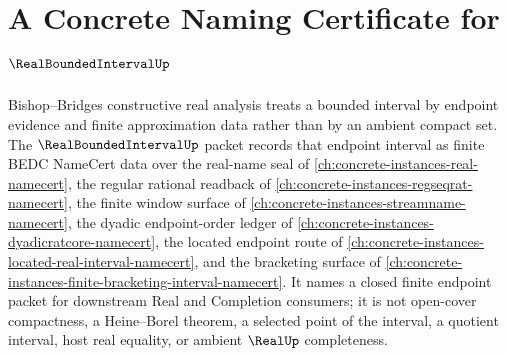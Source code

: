 \chapter{A Concrete Naming Certificate for $\RealBoundedIntervalUp$}
\label{ch:concrete-instances-real-bounded-interval-namecert}

Bishop--Bridges constructive real analysis treats a bounded interval by endpoint evidence and finite approximation data rather than by an ambient compact set. The $\RealBoundedIntervalUp$ packet records that endpoint interval as finite BEDC NameCert data over the real-name seal of \autoref{ch:concrete-instances-real-namecert}, the regular rational readback of \autoref{ch:concrete-instances-regseqrat-namecert}, the finite window surface of \autoref{ch:concrete-instances-streamname-namecert}, the dyadic endpoint-order ledger of \autoref{ch:concrete-instances-dyadicratcore-namecert}, the located endpoint route of \autoref{ch:concrete-instances-located-real-interval-namecert}, and the bracketing surface of \autoref{ch:concrete-instances-finite-bracketing-interval-namecert}. It names a closed finite endpoint packet for downstream Real and Completion consumers; it is not open-cover compactness, a Heine--Borel theorem, a selected point of the interval, a quotient interval, host real equality, or ambient $\RealUp$ completeness.

